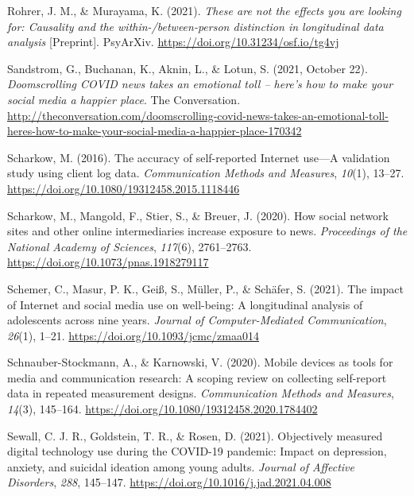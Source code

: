 \documentclass[
  man,mask]{apa7}
\newlength{\cslhangindent}
\newlength{\cslentryspacingunit} %
\newenvironment{CSLReferences}[2] %
 {%
  \setlength{\parindent}{0pt}
  \ifodd #1
  \let\oldpar\par
  \def\par{\hangindent=\cslhangindent\oldpar}
  \fi
  \setlength{\parskip}{#2\cslentryspacingunit}
 }%
 {}
\begin{document}
\begin{CSLReferences}{1}{0}
\leavevmode{}%
Rohrer, J. M., \& Murayama, K. (2021). \emph{These are not the effects you are looking for: {Causality} and the within-/between-person distinction in longitudinal data analysis} {[}Preprint{]}. {PsyArXiv}. \url{https://doi.org/10.31234/osf.io/tg4vj}

\leavevmode{}%
Sandstrom, G., Buchanan, K., Aknin, L., \& Lotun, S. (2021, October 22). \emph{Doomscrolling {COVID} news takes an emotional toll -- here's how to make your social media a happier place}. {The Conversation}. \url{http://theconversation.com/doomscrolling-covid-news-takes-an-emotional-toll-heres-how-to-make-your-social-media-a-happier-place-170342}

\leavevmode{}%
Scharkow, M. (2016). The accuracy of self-reported {Internet} use---{A} validation study using client log data. \emph{Communication Methods and Measures}, \emph{10}(1), 13--27. \url{https://doi.org/10.1080/19312458.2015.1118446}

\leavevmode{}%
Scharkow, M., Mangold, F., Stier, S., \& Breuer, J. (2020). How social network sites and other online intermediaries increase exposure to news. \emph{Proceedings of the National Academy of Sciences}, \emph{117}(6), 2761--2763. \url{https://doi.org/10.1073/pnas.1918279117}

\leavevmode{}%
Schemer, C., Masur, P. K., Geiß, S., Müller, P., \& Schäfer, S. (2021). The impact of {Internet} and social media use on well-being: {A} longitudinal analysis of adolescents across nine years. \emph{Journal of Computer-Mediated Communication}, \emph{26}(1), 1--21. \url{https://doi.org/10.1093/jcmc/zmaa014}

\leavevmode{}%
Schnauber-Stockmann, A., \& Karnowski, V. (2020). Mobile devices as tools for media and communication research: {A} scoping review on collecting self-report data in repeated measurement designs. \emph{Communication Methods and Measures}, \emph{14}(3), 145--164. \url{https://doi.org/10.1080/19312458.2020.1784402}

\leavevmode{}%
Sewall, C. J. R., Goldstein, T. R., \& Rosen, D. (2021). Objectively measured digital technology use during the {COVID-19} pandemic: {Impact} on depression, anxiety, and suicidal ideation among young adults. \emph{Journal of Affective Disorders}, \emph{288}, 145--147. \url{https://doi.org/10.1016/j.jad.2021.04.008}


\end{CSLReferences}
\end{document}
